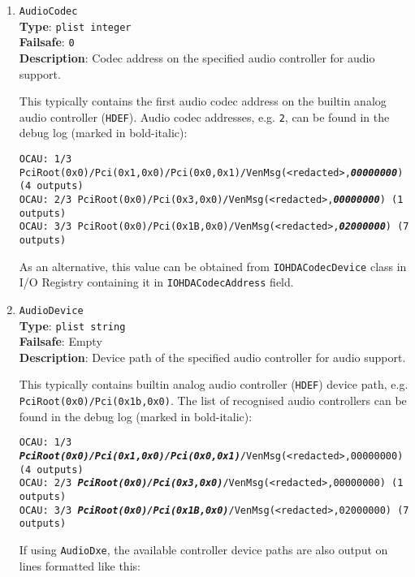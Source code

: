 \documentclass[]{article}
\begin{document}
\begin{enumerate}

\item
  \texttt{AudioCodec}\\
  \textbf{Type}: \texttt{plist\ integer}\\
  \textbf{Failsafe}: \texttt{0}\\
  \textbf{Description}: Codec address on the specified audio controller for audio support.

  This typically contains the first audio codec address on the builtin analog audio controller (\texttt{HDEF}).
  Audio codec addresses, e.g. \texttt{2}, can be found in the debug log (marked in bold-italic):

  \texttt{OCAU: 1/3 PciRoot(0x0)/Pci(0x1,0x0)/Pci(0x0,0x1)/VenMsg(<redacted>,\textit{\textbf{00000000}}) (4 outputs)}\\
  \texttt{OCAU: 2/3 PciRoot(0x0)/Pci(0x3,0x0)/VenMsg(<redacted>,\textit{\textbf{00000000}}) (1 outputs)}\\
  \texttt{OCAU: 3/3 PciRoot(0x0)/Pci(0x1B,0x0)/VenMsg(<redacted>,\textit{\textbf{02000000}}) (7 outputs)}

  As an alternative, this value can be obtained from \texttt{IOHDACodecDevice} class in I/O Registry
  containing it in \texttt{IOHDACodecAddress} field.

\item
  \texttt{AudioDevice}\\
  \textbf{Type}: \texttt{plist\ string}\\
  \textbf{Failsafe}: Empty\\
  \textbf{Description}: Device path of the specified audio controller for audio support.

  This typically contains builtin analog audio controller (\texttt{HDEF}) device path,
  e.g. \texttt{PciRoot(0x0)/Pci(0x1b,0x0)}. The list of recognised audio controllers can be
  found in the debug log (marked in bold-italic):

  \texttt{OCAU: 1/3 \textit{\textbf{PciRoot(0x0)/Pci(0x1,0x0)/Pci(0x0,0x1)}}/VenMsg(<redacted>,00000000) (4 outputs)}\\
  \texttt{OCAU: 2/3 \textit{\textbf{PciRoot(0x0)/Pci(0x3,0x0)}}/VenMsg(<redacted>,00000000) (1 outputs)}\\
  \texttt{OCAU: 3/3 \textit{\textbf{PciRoot(0x0)/Pci(0x1B,0x0)}}/VenMsg(<redacted>,02000000) (7 outputs)}

  If using \texttt{AudioDxe}, the available controller device paths are also output on lines formatted like this:


\end{enumerate}
\end{document}
